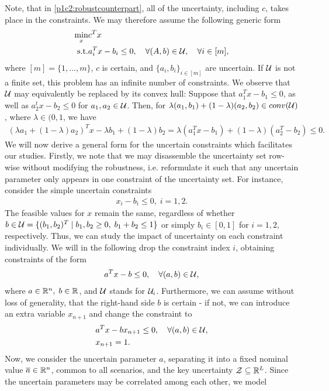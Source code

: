 Note, that in \eqref{p1c2:robustcounterpart}, all of the uncertainty, including $c$, takes place in the constraints. We may therefore assume the following generic form
\begin{align*}
	\min\limits_x & c^Tx \\
	\text{s.t.} & a_i^Tx-b_i\leq 0, \quad \forall (A,b)\in\mathcal{U},\quad\forall i\in[m],
\end{align*}
where $[m]=\{1,\dots,m\}$, $c$ is certain, and $\{a_i,b_i\}_{i\in[m]}$ are uncertain. If $\mathcal{U}$ is not a finite set, this problem has an infinite number of constraints. We observe that $\mathcal{U}$ may equivalently be replaced by its convex hull: Suppose that $a_1^Tx-b_1\leq 0$, as well as $a_2^tx-b_2\leq 0$ for $a_1,a_2\in\mathcal{U}$. Then, for $\lambda (a_1,b_1) + (1-\lambda)(a_2,b_2)\in conv(\mathcal{U})$, where $\lambda\in(0,1$, we have
\begin{align*}
(\lambda a_1 + (1-\lambda)a_2 )^Tx - \lambda b_1 + (1-\lambda)b_2 = \lambda (a_1^Tx-b_1) + (1-\lambda)(a_2^T-b_2)\leq 0. 
\end{align*} 
We will now derive a general form for the uncertain constraints which facilitates our studies. Firstly, we note that we may disassemble the uncertainty set row-wise without modifying the robustness, i.e. reformulate it such that any uncertain parameter only appears in one constraint of the uncertainty set. For instance, consider the simple uncertain constraints
\begin{align*}
x_i-b_i \leq 0,\; i=1,2.
\end{align*}
The feasible values for $x$ remain the same, regardless of whether $b\in \mathcal{U} =\{(b_1,b_2)^T\mid b_1,b_2\geq0,\;b_1+b_2\leq 1\}$ or simply $b_i\in[0,1]$ for $i=1,2$, respectively.
Thus, we can study the impact of uncertainty on each constraint individually. We will in the following drop the constraint index $i$, obtaining constraints of the form
\begin{align*}
	a^Tx-b\leq0,\quad\forall (a,b)\in\mathcal{U},
\end{align*}
where $a\in\mathbb{R}^n,\; b\in\mathbb{R}$, and $\mathcal{U}$ stands for $\mathcal{U}_i$. Furthermore, we can assume without loss of generality, that the right-hand side $b$ is certain - if not, we can introduce an extra variable $x_{n+1}$ and change the constraint to
\begin{align*}
	& a^Tx-bx_{n+1}\leq0,\quad\forall (a,b)\in\mathcal{U},\\
	& x_{n+1} = 1.
\end{align*}
Now, we consider the uncertain parameter $a$, separating it into a fixed nominal value $\overline{ a }\in\mathbb{R}^n$, common to all scenarios, and the key uncertainty $\mathcal{Z}\subseteq\mathbb{R}^L$. Since the uncertain parameters may be correlated among each other, we model
